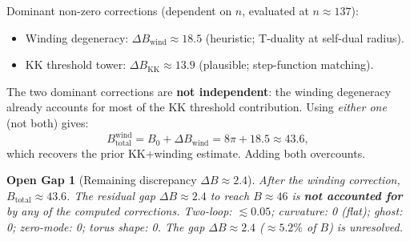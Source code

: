 \documentclass[11pt,a4paper]{article}
\newtheorem{gap}{Open Gap}
\begin{document}
\noindent
Dominant non-zero corrections (dependent on $n$, evaluated at $n \approx 137$):
\begin{itemize}
  \item Winding degeneracy: $\Delta B_\mathrm{wind} \approx 18.5$ (heuristic; T-duality at self-dual radius).
  \item KK threshold tower: $\Delta B_\mathrm{KK} \approx 13.9$ (plausible; step-function matching).
\end{itemize}

\noindent
The two dominant corrections are \textbf{not independent}: the winding
degeneracy already accounts for most of the KK threshold contribution.
Using \emph{either one} (not both) gives:
\[
  B_\mathrm{total}^\mathrm{wind}
  = B_0 + \Delta B_\mathrm{wind}
  = 8\pi + 18.5
  \approx 43.6,
\]
which recovers the prior KK+winding estimate.  Adding both overcounts.

\begin{gap}[Remaining discrepancy $\Delta B \approx 2.4$]
\label{gap:2.4}
After the winding correction, $B_\mathrm{total} \approx 43.6$.
The residual gap $\Delta B \approx 2.4$ to reach $B \approx 46$
is \textbf{not accounted for} by any of the computed corrections.
Two-loop: $\lesssim 0.05$; curvature: 0 (flat); ghost: 0; zero-mode: 0; torus shape: 0.
The gap $\Delta B \approx 2.4$ ($\approx 5.2\%$ of $B$) is unresolved.
\end{gap}
\end{document}
